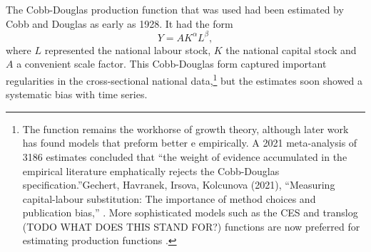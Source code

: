 {The \gls{Cobb-Douglas} production function that was used had been estimated by Cobb and Douglas \cite{cobbTheoryProduction1928} as early as 1928. It had the form
\begin{equation*}
Y=AK^\alpha L^\beta, 
 \label{eqn-Cobb-Douglas}    
\end{equation*}
where $L$ represented the national labour stock, $K$ the national capital stock and  $A$ a convenient scale factor. This \gls{Cobb-Douglas} form captured  important regularities in the cross-sectional national data,\footnote{The function remains the workhorse of growth theory, although later work has found models that preform better e empirically.  A 2021 meta-analysis of 3186 estimates concluded that ``the weight of evidence accumulated in the empirical literature emphatically rejects the Cobb-Douglas specification.''Gechert, Havranek, Irsova, Kolcunova (2021), ``Measuring capital-labour substitution: The importance of method choices and publication bias,'' \cite{GET_REF}. %
More sophisticated models such as the CES and translog (TODO WHAT DOES THIS STAND FOR?) functions are now preferred for estimating production functions \cite{GET_REF}.}  %
but the estimates soon showed a systematic bias with time series. 


}
